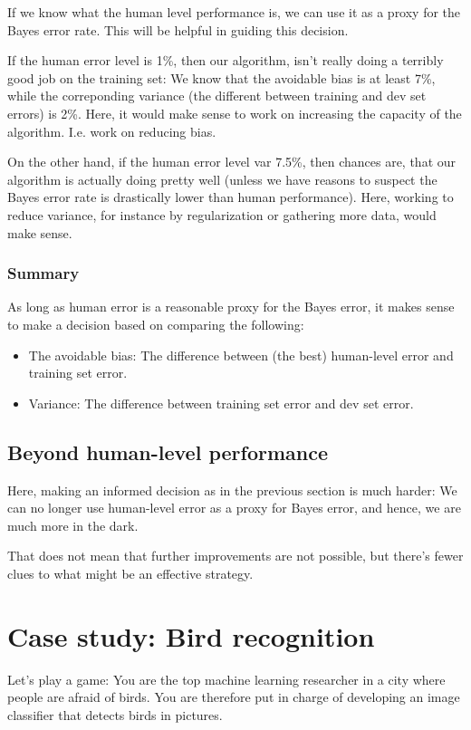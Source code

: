 \documentclass[12pt, a4paper]{article}
\numberwithin{equation}{section}
\begin{document}
If we know what the human level performance is, we can use it as a proxy for the Bayes error rate. This will be helpful in guiding this decision.

If the human error level is 1\%, then our algorithm, isn't really doing a terribly good job on the training set: We know that the avoidable bias is at least 7\%, while the correponding variance (the different between training and dev set errors) is 2\%. Here, it would make sense to work on increasing the capacity of the algorithm. I.e. work on reducing bias.

On the other hand, if the human error level var 7.5\%, then chances are, that our algorithm is actually doing pretty well (unless we have reasons to suspect the Bayes error rate is drastically lower than human performance). Here, working to reduce variance, for instance by regularization or gathering more data, would make sense.

\subsubsection{Summary}
As long as human error is a reasonable proxy for the Bayes error, it makes sense to make a decision based on comparing the following:
\begin{itemize}
\item The avoidable bias: The difference between (the best) human-level error and training set error.
\item Variance: The difference between training set error and dev set error.
\end{itemize}

\subsection{Beyond human-level performance}
Here, making an informed decision as in the previous section is much harder: We can no longer use human-level error as a proxy for Bayes error, and hence, we are much more in the dark.

That does not mean that further improvements are not possible, but there's fewer clues to what might be an effective strategy.

\section{Case study: Bird recognition}
Let's play a game: You are the top machine learning researcher in a city where people are afraid of birds. You are therefore put in charge of developing an image classifier that detects birds in pictures.
\end{document}
